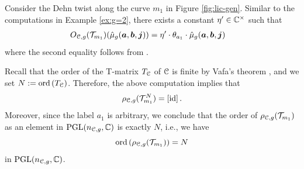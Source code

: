 \documentclass[11pt]{article}
\begin{document}
\begin{example}\label{ex:g=1}
Consider the Dehn twist along the curve $m_1$ in Figure \ref{fig:lic-gen}. Similar to the computations in Example \ref{ex:g=2}, there exists a constant $\eta' \in {\mathbb{C}}^\times$ such that 
\[\begin{split}
&\RTmat{\cC}{g}(\dt_{m_1})(\Wbase{g}{a}{b}{j})
=\eta' \cdot \theta_{a_{1}}\cdot \Wbase{g}{a}{b}{j}
\end{split}\]
where the second equality follows from \cite[Eq.\ (3.1.6)]{BK01}. 

Recall that  the order of the T-matrix $T_{\mathcal{C}}$ of $\mathcal{C}$ is finite by Vafa's theorem \cite{Vafa88}, and we set $N:={\operatorname{ord}\,}(T_{\mathcal{C}})$. Therefore, the above computation implies that
\begin{equation}\label{eq:fin-ord}
\RTrep{\cC}{g}(\dt_{m_1}^N) = [\id]\,.
\end{equation}
Moreover, since the label $a_1$ is arbitrary, we  conclude that the order of $\RTrep{\cC}{g}(\dt_{m_1})$ as an element in $\operatorname{PGL}(n_{{\mathcal{C}}, {g}}, {\mathbb{C}})$ is exactly $N$, i.e., we have
\begin{equation} \label{eq:fin-ord-2}
\ord(\RTrep{\cC}{g}(\dt_{m_1})) = N
\end{equation}
in $\operatorname{PGL}(n_{{\mathcal{C}}, {g}}, {\mathbb{C}})$.    
\end{example}
\end{document}

